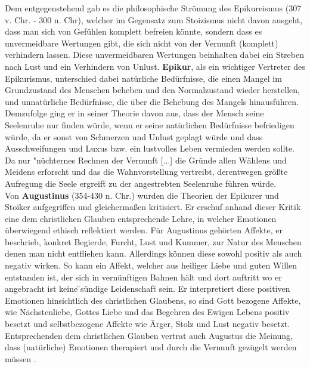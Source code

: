 %
%
Dem entgegenstehend gab es die philosophische Strömung des Epikureismus (307 v. Chr. - 300 n. Chr), welcher im Gegensatz zum Stoizismus nicht davon ausgeht, dass man sich von Gefühlen komplett befreien könnte, sondern dass es unvermeidbare Wertungen gibt, die sich nicht von der Vernunft (komplett) verhindern lassen. Diese unvermeidbaren Wertungen beinhalten dabei ein Streben nach Lust und ein Verhindern von Unlust. \textbf{Epikur}, als ein wichtiger Vertreter des Epikurismus, unterschied dabei natürliche Bedürfnisse, die einen Mangel im Grundzustand des Menschen beheben und den Normalzustand wieder herstellen, und unnatürliche Bedürfnisse, die über die Behebung des Mangels hinausführen. Demzufolge ging er in seiner Theorie davon aus, dass der Mensch seine Seelenruhe nur finden würde, wenn er seine natürlichen Bedürfnisse befriedigen würde, da er sonst von Schmerzen und Unlust geplagt würde und dass Ausschweifungen und Luxus bzw. ein lustvolles Leben vermieden werden sollte. Da nur "nüchternes Rechnen der Vernunft [...] die Gründe allen Wählens und Meidens erforscht und das die Wahnvorstellung vertreibt, derentwegen größte Aufregung die Seele ergreift\"{} \cite{hossenfelder_geschichte_2017} zu der angestrebten Seelenruhe führen würde.\\
%
%
Von \textbf{Augustinus} (354-430 n. Chr.) wurden die Theorien der Epikurer und Stoiker aufgegriffen und gleichermaßen kritisiert. Er erschuf anhand dieser Kritik eine dem christlichen Glauben entsprechende Lehre, in welcher Emotionen überwiegend ethisch reflektiert werden. Für Augustinus gehörten Affekte, er beschrieb, konkret Begierde, Furcht, Lust und Kummer, zur Natur des Menschen denen man nicht entfliehen kann. Allerdings können diese sowohl positiv als auch negativ wirken. So kann ein Affekt, welcher aus heiliger Liebe und guten Willen entstanden ist, der sich in vernünftigen Bahnen hält und dort auftritt wo er angebracht ist keine \"{}sündige Leidenschaft\"{} sein. Er interpretiert diese positiven Emotionen hinsichtlich des christlichen Glaubens, so sind Gott bezogene Affekte, wie Nächstenliebe, Gottes Liebe und das Begehren des Ewigen Lebens positiv besetzt und selbstbezogene Affekte wie Ärger, Stolz und Lust negativ besetzt. Entsprechenden dem christlichen Glauben vertrat auch Augustus die Meinung, dass (natürliche) Emotionen therapiert und durch die Vernunft gezügelt werden müssen \cite{schafer_passiones_2013}.\\
%
%
